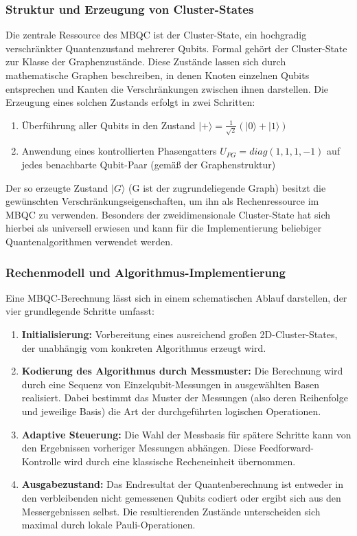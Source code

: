 \subsubsection*{Struktur und Erzeugung von Cluster-States}
Die zentrale Ressource des MBQC ist der Cluster-State, ein hochgradig verschränkter Quantenzustand mehrerer Qubits. Formal gehört der Cluster-State zur Klasse der Graphenzustände. Diese Zustände lassen sich durch mathematische Graphen beschreiben, in denen Knoten einzelnen Qubits entsprechen und Kanten die Verschränkungen zwischen ihnen darstellen. Die Erzeugung eines solchen Zustands erfolgt in zwei Schritten:

\begin{enumerate}
    \item Überführung aller Qubits in den Zustand $|+\rangle = \frac{1}{\sqrt{2}}(|0\rangle + |1\rangle)$
    \item Anwendung eines kontrollierten Phasengatters $U_{PG}=diag(1,1,1,-1)$ auf jedes benachbarte Qubit-Paar (gemäß der Graphenstruktur)
\end{enumerate}

Der so erzeugte Zustand $|G\rangle$ (G ist der zugrundeliegende Graph) besitzt die gewünschten Verschränkungseigenschaften, um ihn als Rechenressource im MBQC zu verwenden. Besonders der zweidimensionale Cluster-State hat sich hierbei als universell erwiesen und kann für die Implementierung beliebiger Quantenalgorithmen verwendet werden. \autocite[2-3]{briegelMeasurementbasedQuantumComputation2009}

\subsubsection*{Rechenmodell und Algorithmus-Implementierung}

Eine MBQC-Berechnung lässt sich in einem schematischen Ablauf darstellen, der vier grundlegende Schritte umfasst:
\begin{enumerate}
    \item \textbf{Initialisierung:} Vorbereitung eines ausreichend großen 2D-Cluster-States, der unabhängig vom konkreten Algorithmus erzeugt wird.
    \item \textbf{Kodierung des Algorithmus durch Messmuster:} Die Berechnung wird durch eine Sequenz von Einzelqubit-Messungen in ausgewählten Basen realisiert. Dabei bestimmt das Muster der Messungen (also deren Reihenfolge und jeweilige Basis) die Art der durchgeführten logischen Operationen.
    \item \textbf{Adaptive Steuerung:} Die Wahl der Messbasis für spätere Schritte kann von den Ergebnissen vorheriger Messungen abhängen. Diese Feedforward-Kontrolle wird durch eine klassische Recheneinheit übernommen.
    \item \textbf{Ausgabezustand:} Das Endresultat der Quantenberechnung ist entweder in den verbleibenden nicht gemessenen Qubits codiert oder ergibt sich aus den Messergebnissen selbst. Die resultierenden Zustände unterscheiden sich maximal durch lokale Pauli-Operationen.
\end{enumerate}

